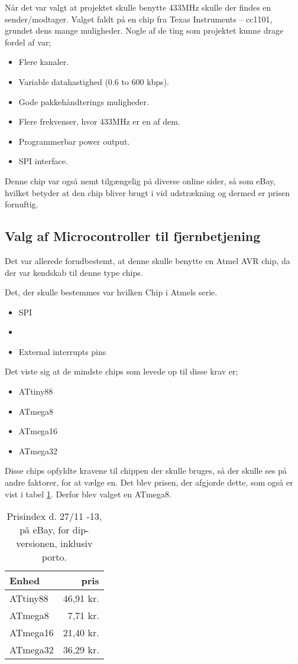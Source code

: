 \documentclass[Main]{subfiles}
\begin{document}
Når det var valgt at projektet skulle benytte 433MHz skulle der findes en sender/modtager.
Valget faldt på en chip fra Texas Instruments -- cc1101\cite{TI-cc1101}, grundet dens mange muligheder.
Nogle af de ting som projektet kunne drage fordel af var;

\begin{itemize}
\item Flere kanaler.
\item Variable datahastighed (0.6 to 600 kbps).
\item Gode pakkehåndterings muligheder. 
\item Flere frekvenser, hvor 433MHz er en af dem.
\item Programmerbar power output.
\item SPI interface.
\end{itemize}

Denne chip var også nemt tilgængelig på diverse online sider, så som eBay\cite{eBay}, hvilket betyder at den chip bliver brugt i vid udstrækning og dermed er prisen fornuftig.




\subsection{Valg af Microcontroller til fjernbetjening}

Det var allerede forudbestemt, at denne skulle benytte en Atmel AVR chip, da der var kendskab til denne type chips.

Det, der skulle bestemmes var hvilken Chip i Atmels serie.

\begin{itemize}
\item SPI
\item \itoc
\item External interrupts pins
\end{itemize}

Det viste sig at de mindste chips som levede op til disse krav er;

\begin{itemize}
\item ATtiny88
\item ATmega8
\item ATmega16
\item ATmega32
\end{itemize}


Disse chips opfyldte kravene til chippen der skulle bruges, så der skulle ses på andre faktorer, for at vælge en. 
Det blev prisen, der afgjorde dette, som også er vist i tabel \ref{Tab:prisIndex}.
Derfor blev valget en ATmega8.
\begin{table}[H]
\centering
	\begin{tabular}{l r}\hline
	Enhed & pris \\ \hline
	ATtiny88 & 46,91 kr.\\
	ATmega8  & 7,71 kr.\\
	ATmega16 & 21,40 kr.\\
	ATmega32 & 36,29 kr. \\ \hline
	\end{tabular}
\caption{Prisindex d. 27/11 -13, på eBay, for dip-versionen, inklusiv porto.}
\label{Tab:prisIndex}
\end{table}
\end{document}
